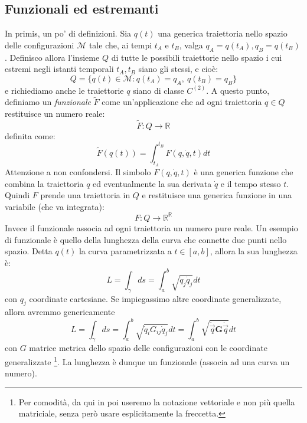 \documentclass[a4paper,openany]{article}
\begin{document}
	\subsection{Funzionali ed estremanti}
	In primis, un po' di definizioni. Sia $q(t)$ una generica traiettoria nello spazio delle configurazioni $\mathcal{M}$ tale che, ai tempi $t_A \mbox{ e } t_B$, valga $q_A = q(t_A), q_B = q(t_B)$. Definisco allora l'insieme $Q$ di tutte le possibili traiettorie nello spazio i cui estremi negli istanti temporali $t_A, t_B$ siano gli stessi, e cioè:
	\begin{equation}
		Q = \{q(t)\in \mathcal{M}: q(t_A) = q_A, \> q(t_B) = q_B\}
	\end{equation}
	e richiediamo anche le traiettorie $q$ siano di classe $C^{(2)}$. A questo punto, definiamo un \textit{funzionale} $\tilde{F}$ come un'applicazione che ad ogni traiettoria $q \in Q$ restituisce un numero reale:
	$$
	\tilde{F} : Q \rightarrow \mathbb{R}
	$$
	definita come:
	$$
	\tilde{F}(q(t)) = \int_{t_A}^{t_B}F(q,\dot{q},t) dt
	$$
	Attenzione a non confondersi. Il simbolo $F(q,\dot{q},t)$ è una generica funzione che combina la traiettoria $q$ ed eventualmente la sua derivata $\dot{q}$ e il tempo stesso $t$. Quindi $F$ prende una traiettoria in $Q$ e restituisce una generica funzione in una variabile (che va integrata):
	$$
	F : Q \rightarrow \mathbb{R}^{\mathbb{R}}
	$$
	Invece il funzionale associa ad ogni traiettoria un numero pure reale. Un esempio di funzionale è quello della lunghezza della curva che connette due punti nello spazio. Detta $q(t)$ la curva parametrizzata a $t\in[a,b]$, allora la sua lunghezza è:
	$$
	L = \int_{\gamma}ds = \int_{a}^{b}\sqrt{\dot{q}_j \dot{q}_j}dt
	$$
	con $q_j$ coordinate cartesiane. Se impiegassimo altre coordinate generalizzate, allora avremmo genericamente
	$$
	L = \int_{\gamma}ds = \int_{a}^{b}\sqrt{\dot{q}_i G_{ij}\dot{q}_j}dt = \int_{a}^{b}\sqrt{\dot{\vec{q}} \textbf{G}\dot{\vec{q}}}dt
	$$
	con $G$ matrice metrica dello spazio delle configurazioni con le coordinate generalizzate \footnote{Per comodità, da qui in poi useremo la notazione vettoriale e non più quella matriciale, senza però usare esplicitamente la freccetta.}. La lunghezza è dunque un funzionale (associa ad una curva un numero). 
	
\end{document}
